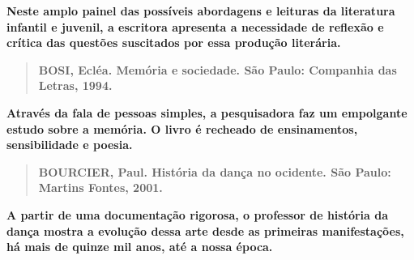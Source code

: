 \documentclass{extarticle}
\begin{document}
\textbf{Neste amplo painel das possíveis abordagens e leituras da
literatura infantil e juvenil, a escritora apresenta a necessidade de
reflexão e crítica das questões suscitados por essa produção literária.}

\begin{quote}
\textbf{BOSI, Ecléa. Memória e sociedade. São Paulo: Companhia das
Letras, 1994.}
\end{quote}

\textbf{Através da fala de pessoas simples, a pesquisadora faz um
empolgante estudo sobre a memória. O livro é recheado de ensinamentos,
sensibilidade e poesia.}

\begin{quote}
\textbf{BOURCIER, Paul. História da dança no ocidente. São Paulo:
Martins Fontes, 2001.}
\end{quote}

\textbf{A partir de uma documentação rigorosa, o professor de história
da dança mostra a evolução dessa arte desde as primeiras manifestações,
há mais de quinze mil anos, até a nossa época.}
\end{document}
